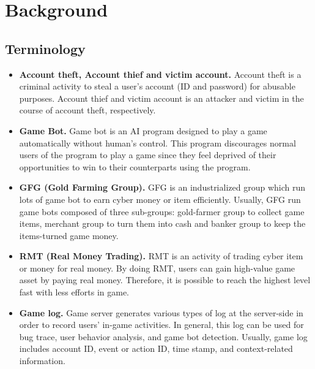 \documentclass[conference]{IEEEtran}
\begin{document}

\section{Background}
\label{section:background}

\subsection{Terminology}
\label{section:term}
\begin{itemize}
\item\texttt{}{\bfseries Account theft, Account thief and victim account.} Account theft is a criminal activity to steal a user's account (ID and password) for abusable purposes. Account thief and victim account is an attacker and victim in the course of account theft, respectively. 

\item\texttt{}{\bfseries Game Bot.} Game bot is an AI program designed to play a game automatically without human's control. %
This program discourages normal users of the program to play a game since they feel deprived of their opportunities to win to their counterparts using the program. 

\item\texttt{}{\bfseries GFG (Gold Farming Group).} GFG is an industrialized group which run lots of game bot to earn cyber money or item efficiently. Usually, GFG run game bots composed of three sub-groups: gold-farmer group to collect game items, merchant group to turn them into cash and banker group to keep the items-turned game money.

\item\texttt{}{\bfseries RMT (Real Money Trading).} RMT is an activity of trading cyber item or money for real money. By doing RMT, users can gain high-value game asset by paying real money. Therefore, it is possible to reach the highest level fast with less efforts in game. %

\item\texttt{}{\bfseries Game log.} Game server generates various types of log at the server-side in order to record users' in-game activities. In general, this log can be used for bug trace, user behavior analysis, and game bot detection. Usually, game log includes account ID, event or action ID, time stamp, and context-related information. 
\end{itemize} 
\end{document}
